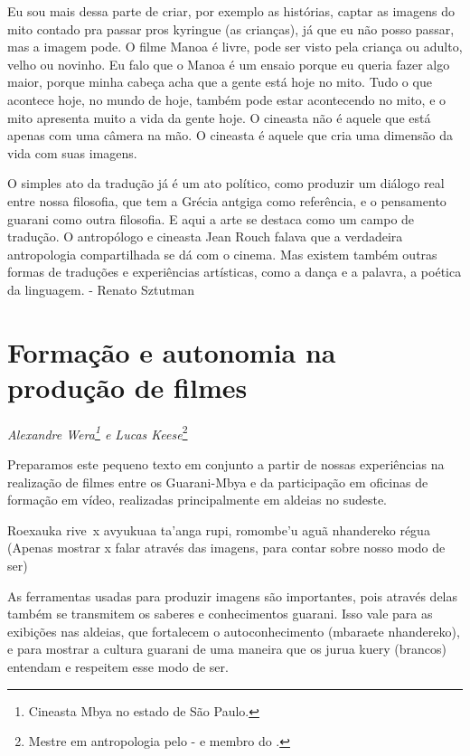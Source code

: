 {{Eu sou mais dessa parte de criar, por exemplo as histórias, captar as
imagens do mito contado pra passar pros kyringue (as
crianças), já que eu não posso passar, mas a imagem pode. O filme Manoa
é livre, pode ser visto pela criança ou adulto, velho ou novinho. Eu
falo que o Manoa é um ensaio porque eu queria fazer algo maior, porque
minha cabeça acha que a gente está hoje no mito. Tudo o que acontece
hoje, no mundo de hoje, também pode estar acontecendo no mito, e o mito
apresenta muito a vida da gente hoje. O cineasta não é aquele que está
apenas com uma câmera na mão. O cineasta é aquele que cria uma dimensão
da vida com suas imagens.

O simples ato da tradução já é um ato político, como produzir um diálogo
real entre nossa filosofia, que tem a Grécia antgiga como referência, e
o pensamento guarani como outra filosofia. E aqui a arte se destaca
como um campo de tradução. O antropólogo e cineasta Jean Rouch falava
que a verdadeira antropologia compartilhada se dá com o cinema. Mas
existem também outras formas de traduções e experiências artísticas,
como a dança e a palavra, a poética da linguagem. - Renato Sztutman

\chapter{Formação e autonomia na produção de filmes}
\begin{flushright}
\emph{Alexandre Wera\footnote{Cineasta Mbya no estado de São Paulo.} e Lucas
Keese}\footnote{Mestre em antropologia pelo - e membro do
.}
\end{flushright}
\medskip

Preparamos este pequeno texto em conjunto a partir de nossas
experiências na realização de filmes entre os Guarani-Mbya e da
participação em oficinas de formação em vídeo, realizadas
principalmente em aldeias no sudeste.

Roexauka rive~x avyukuaa ta’anga rupi, romombe’u aguã nhandereko régua
(Apenas mostrar x falar através das imagens, para contar sobre nosso
modo de ser)%


As ferramentas usadas para produzir imagens são importantes, pois
através delas também se transmitem os saberes e conhecimentos guarani.
Isso vale para as exibições nas aldeias, que fortalecem o
autoconhecimento (mbaraete nhandereko), e para mostrar a cultura
guarani de uma maneira que os jurua kuery (brancos) entendam e
respeitem esse modo de ser.

}}
